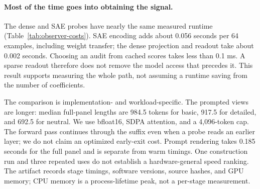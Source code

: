 \paragraph{Most of the time goes into obtaining the signal.}
The dense and SAE probes have nearly the same measured runtime
(Table~\ref{tab:observer-costs}). SAE encoding adds about 0.056 seconds per
64 examples, including weight transfer; the dense projection and readout take
about 0.002 seconds. Choosing an audit from cached scores takes less than
0.1 ms. A sparse readout therefore does not remove the model access that
precedes it. This result supports measuring the whole path, not assuming a
runtime saving from the number of coefficients.

The comparison is implementation- and workload-specific. The prompted views
are longer: median full-panel lengths are 984.5 tokens for basic, 917.5 for
detailed, and 692.5 for neutral. We use bfloat16, SDPA attention, and a
4,096-token cap. The forward pass continues through the suffix even when a
probe reads an earlier layer; we do not claim an optimized early-exit cost.
Prompt rendering takes 0.185 seconds for the full panel and is separate from
warm timings. One construction run and three repeated uses do not establish
a hardware-general speed ranking. The artifact records stage timings,
software versions, source hashes, and GPU memory; CPU memory is a
process-lifetime peak, not a per-stage measurement.
